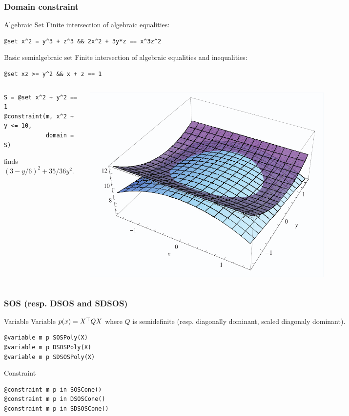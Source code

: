\documentclass{beamer}
\begin{document}
  \begin{frame}[fragile]
    \frametitle{Domain constraint}
    \begin{block}{Algebraic Set}
      Finite intersection of algebraic equalities:
\begin{verbatim}
@set x^2 = y^3 + z^3 && 2x^2 + 3y*z == x^3z^2
\end{verbatim}
    \end{block}
    \begin{block}{Basic semialgebraic set}
      Finite intersection of algebraic equalities and inequalities:
\begin{verbatim}
@set xz >= y^2 && x + z == 1
\end{verbatim}
    \end{block}
    \begin{columns}
      \begin{column}{0.5\textwidth}
\begin{verbatim}
S = @set x^2 + y^2 == 1
@constraint(m, x^2 + y <= 10,
            domain = S)
\end{verbatim}
    finds $(3-y/6)^2 + 35/36y^2$.
      \end{column}
      \begin{column}{0.5\textwidth}
        \centering
        \includegraphics[width=0.7\textwidth]{algebraic_set.png}
      \end{column}
    \end{columns}
  \end{frame}
  \begin{frame}[fragile]
    \frametitle{SOS (resp. DSOS and SDSOS)}
    \begin{block}{Variable}
      Variable $p(x) = X^\top Q X$ where $Q$ is semidefinite (resp. diagonally dominant, scaled diagonaly dominant).
\begin{verbatim}
@variable m p SOSPoly(X)
@variable m p DSOSPoly(X)
@variable m p SDSOSPoly(X)
\end{verbatim}
    \end{block}
    \begin{block}{Constraint}
\begin{verbatim}
@constraint m p in SOSCone()
@constraint m p in DSOSCone()
@constraint m p in SDSOSCone()
\end{verbatim}
    \end{block}
  \end{frame}
\end{document}
